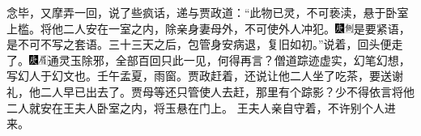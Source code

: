 念毕，又摩弄一回，说了些疯话，递与贾政道：``此物已灵，不可亵渎，悬于卧室上槛。将他二人安在一室之内，除亲身妻母外，不可使外人冲犯。{\includegraphics[width=3mm]{../Images/00004}\includegraphics[width=3mm]{../Images/00011}\footnotesize \kaishu 是要紧语，是不可不写之套语。}三十三天之后，包管身安病退，复旧如初。''说着，回头便走了。{\includegraphics[width=3mm]{../Images/00004}\includegraphics[width=3mm]{../Images/00010}\footnotesize \kaishu 通灵玉除邪，全部百回只此一见，何得再言？僧道踪迹虚实，幻笔幻想，写幻人于幻文也。壬午孟夏，雨窗。}贾政赶着，还说让他二人坐了吃茶，要送谢礼，他二人早已出去了。贾母等还只管使人去赶，那里有个踪影？少不得依言将他二人就安在王夫人卧室之内，将玉悬在门上。
王夫人亲自守着，不许别个人进来。

